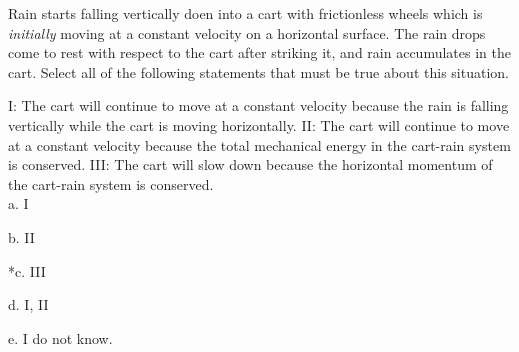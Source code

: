 
Rain starts falling vertically doen into a cart with frictionless wheels which is \textit{initially} moving at a constant velocity on a horizontal surface. The rain drops come to rest with respect to the cart after striking it, and rain accumulates in the cart. Select all of the following statements that must be true about this situation.

I: The cart will continue to move at a constant velocity because the rain is falling vertically while the cart is moving horizontally.
II: The cart will continue to move at a constant velocity because the total mechanical energy in the cart-rain system is conserved.
III: The cart will slow down because the horizontal momentum of the cart-rain system is conserved.\\

a. I

b. II

*c. III

d. I, II

e. I do not know.\\

